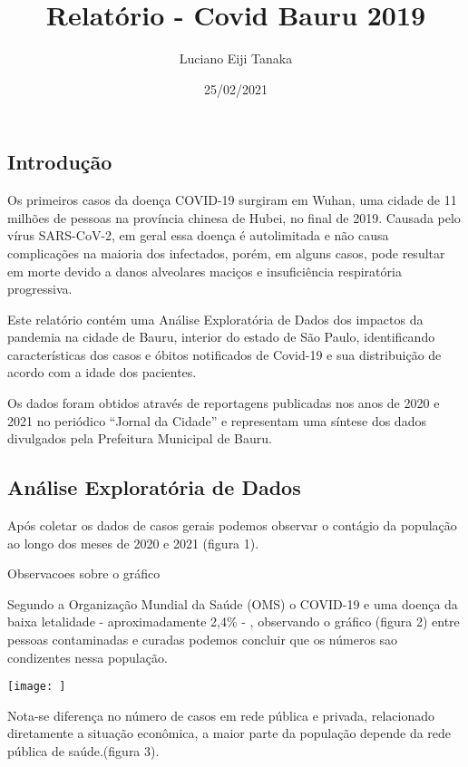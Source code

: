 \documentclass[
]{article}
\title{Relatório - Covid Bauru 2019}
\author{Luciano Eiji Tanaka}
\date{25/02/2021}
\begin{document}
\maketitle

\hypertarget{introduuxe7uxe3o}{%
\subsection{Introdução}\label{introduuxe7uxe3o}}

Os primeiros casos da doença COVID-19 surgiram em Wuhan, uma cidade de
11 milhões de pessoas na província chinesa de Hubei, no final de 2019.
Causada pelo vírus SARS-CoV-2, em geral essa doença é autolimitada e não
causa complicações na maioria dos infectados, porém, em alguns casos,
pode resultar em morte devido a danos alveolares maciços e insuficiência
respiratória progressiva.

Este relatório contém uma Análise Exploratória de Dados dos impactos da
pandemia na cidade de Bauru, interior do estado de São Paulo,
identificando características dos casos e óbitos notificados de Covid-19
e sua distribuição de acordo com a idade dos pacientes.

Os dados foram obtidos através de reportagens publicadas nos anos de
2020 e 2021 no periódico ``Jornal da Cidade'' e representam uma síntese
dos dados divulgados pela Prefeitura Municipal de Bauru.

\hypertarget{anuxe1lise-exploratuxf3ria-de-dados}{%
\subsection{Análise Exploratória de
Dados}\label{anuxe1lise-exploratuxf3ria-de-dados}}

Após coletar os dados de casos gerais podemos observar o contágio da
população ao longo dos meses de 2020 e 2021 (figura 1).

Observacoes sobre o gráfico

Segundo a Organização Mundial da Saúde (OMS) o COVID-19 e uma doença da
baixa letalidade - aproximadamente 2,4\% - , observando o gráfico
(figura 2) entre pessoas contaminadas e curadas podemos concluir que os
números sao condizentes nessa população.

\texttt{[image: ]}

Nota-se diferença no número de casos em rede pública e privada,
relacionado diretamente a situação econômica, a maior parte da população
depende da rede pública de saúde.(figura 3).
\end{document}
